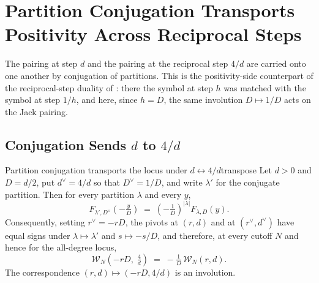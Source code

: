 \documentclass[11pt,letterpaper]{article}
\begin{document}
\section{Partition Conjugation Transports Positivity Across Reciprocal Steps}
\label{sec:dual}

The pairing at step $d$ and the pairing at the reciprocal step $4/d$ are carried
onto one another by conjugation of partitions. This is the positivity-side
counterpart of the reciprocal-step duality of : there the
symbol at step $h$ was matched with the symbol at step $1/h$, and here, since
$h=D$, the same involution $D\mapsto1/D$ acts on the Jack pairing.

\subsection{Conjugation Sends \texorpdfstring{$d$}{d} to \texorpdfstring{$4/d$}{4/d}}

\begin{theorem}{Partition conjugation transports the locus under $d\leftrightarrow4/d$}{transpose}
Let $d>0$ and $D=d/2$, put $d^{\vee}=4/d$ so that $D^{\vee}=1/D$, and write
$\lambda'$ for the conjugate partition. Then for every partition $\lambda$ and
every $y$,
\begin{equation}
  F_{\lambda',D^{\vee}}\!\left(-\tfrac{y}{D}\right)
  \;=\;\left(-\tfrac1D\right)^{|\lambda|}F_{\lambda,D}(y).
  \label{eq:transposeF}
\end{equation}
Consequently, setting $r^{\vee}=-rD$, the pivots at $(r,d)$ and at
$(r^{\vee},d^{\vee})$ have equal signs under $\lambda\mapsto\lambda'$ and
$s\mapsto-s/D$, and therefore, at every cutoff $N$ and hence for the all-degree
locus,
\begin{equation}
  \mathcal{W}_N\!\left(-rD,\;\tfrac4d\right)
  \;=\;-\tfrac1D\,\mathcal{W}_N(r,d).
  \label{eq:transposeW}
\end{equation}
The correspondence $(r,d)\mapsto(-rD,4/d)$ is an involution.
\end{theorem}
\end{document}
